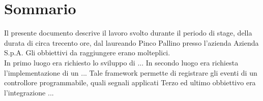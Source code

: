 \cleardoublepage
{}
{}
\begingroup
\let\clearpage\relax
\let\cleardoublepage\relax
\let\cleardoublepage\relax

\chapter*{Sommario}

Il presente documento descrive il lavoro svolto durante il periodo di stage, della durata di circa trecento ore, dal laureando Pinco Pallino presso l'azienda Azienda S.p.A.
Gli obbiettivi da raggiungere erano molteplici.\\
In primo luogo era richiesto lo sviluppo di ...
In secondo luogo era richiesta l'implementazione di un ...
Tale framework permette di registrare gli eventi di un controllore programmabile, quali segnali applicati
Terzo ed ultimo obbiettivo era l'integrazione ...




\endgroup

\vfill
